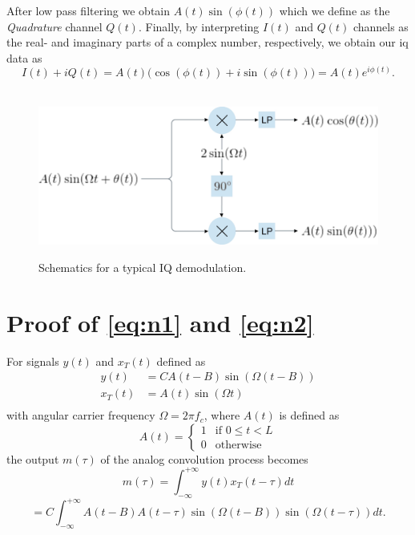 \begin{appendices}
After low pass filtering we obtain $A(t)\sin(\phi(t))$ which we define as the \emph{Quadrature} channel $Q(t)$. Finally, by interpreting $I(t)$ and $Q(t)$ channels as the real- and imaginary parts of a complex number, respectively, we obtain our \gls{iq} data as
\begin{equation}
	I(t)+iQ(t)=A(t)\Big(\cos(\phi(t))+i\sin(\phi(t))\Big)=A(t)e^{i\phi(t)}.
\end{equation}

\begin{figure}
	\centering
	\hbox{\hspace{-0.5em} \includegraphics[scale=0.60]{figs_temp/iq_demod.jpg}}
	\caption{Schematics for a typical IQ demodulation.}
	\label{fig:iq_demod}
\end{figure}

\chapter{Proof of \ref{eq:n1} and \ref{eq:n2}}

For signals $y(t)$ and $x_T(t)$ defined as
\begin{equation}
	\begin{split}
		y(t) &= CA(t - B)\sin(\Omega(t - B)) \\
		x_T(t) &= A(t)\sin(\Omega t) \\
	\end{split}
\end{equation}
with angular carrier frequency $\Omega = 2\pi f_c$, where $A(t)$ is defined as 
\begin{equation}
	A(t) = \begin{cases}
		1 & \text{if $0 \leq t < L$} \\
		0 & \text{otherwise}
	\end{cases}
\end{equation}
the output $m(\tau)$ of the analog convolution process becomes
\begin{equation}
	m(\tau) 
	= \int_{-\infty}^{+\infty}y(t)x_T(t-\tau)dt
\end{equation}
\begin{equation}	
	= C \int_{-\infty}^{+\infty}A(t-B)A(t-\tau)\sin(\Omega(t-B))\sin(\Omega(t-\tau))dt.
\end{equation}


\end{appendices}
